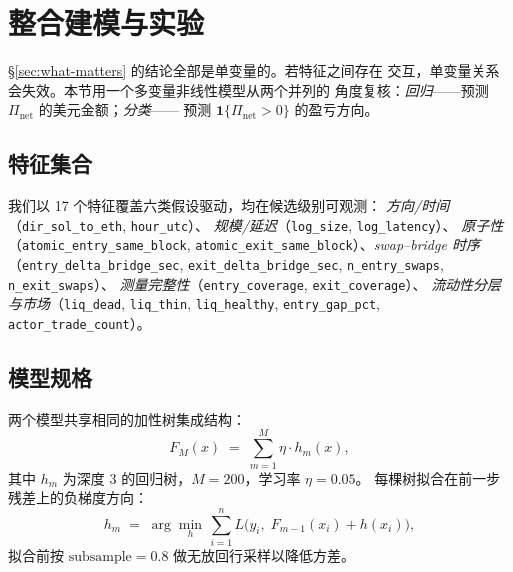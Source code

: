 \documentclass[sigconf,nonacm,10pt]{acmart}
\newcommand{\Pnet}{\Pi_{\text{net}}}
\begin{document}
\section{整合建模与实验}
\label{sec:model}

\S\ref{sec:what-matters} 的结论全部是单变量的。若特征之间存在
交互，单变量关系会失效。本节用一个多变量非线性模型从两个并列的
角度复核：\emph{回归}——预测 $\Pnet$ 的美元金额；\emph{分类}——
预测 $\mathbf{1}\{\Pnet>0\}$ 的盈亏方向。

\subsection{特征集合}
\label{sec:features}

我们以 17 个特征覆盖六类假设驱动，均在候选级别可观测：
\emph{方向/时间}（\texttt{dir\_sol\_to\_eth}, \texttt{hour\_utc}）、
\emph{规模/延迟}（\texttt{log\_size}, \texttt{log\_latency}）、
\emph{原子性}（\texttt{atomic\_entry\_same\_block},
\texttt{atomic\_exit\_same\_block}）、\emph{swap--bridge 时序}
（\texttt{entry\_delta\_bridge\_sec},
\texttt{exit\_delta\_bridge\_sec},
\texttt{n\_entry\_swaps}, \texttt{n\_exit\_swaps}）、
\emph{测量完整性}（\texttt{entry\_coverage}, \texttt{exit\_coverage}）、
\emph{流动性分层与市场}（\texttt{liq\_dead}, \texttt{liq\_thin},
\texttt{liq\_healthy}, \texttt{entry\_gap\_pct},
\texttt{actor\_trade\_count}）。

\subsection{模型规格}

两个模型共享相同的加性树集成结构：
\begin{equation}
F_M(x) \;=\; \sum_{m=1}^{M} \eta\cdot h_m(x),
\label{eq:gbm}
\end{equation}
其中 $h_m$ 为深度 $3$ 的回归树，$M=200$，学习率 $\eta=0.05$。
每棵树拟合在前一步残差上的负梯度方向：
\begin{equation}
h_m \;=\; \arg\min_{h}\,\sum_{i=1}^{n}
L\!\bigl(y_i,\; F_{m-1}(x_i)+h(x_i)\bigr),
\label{eq:gbm-update}
\end{equation}
拟合前按 $\text{subsample}=0.8$ 做无放回行采样以降低方差。
\end{document}
